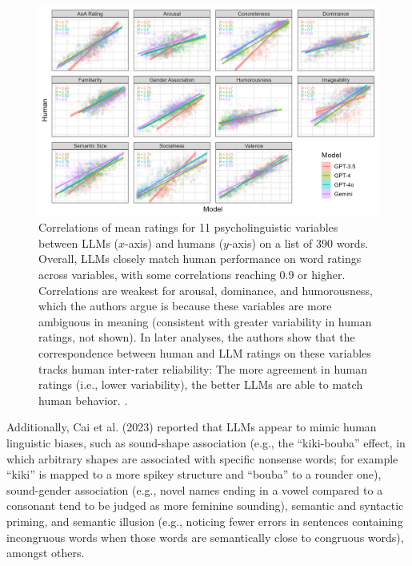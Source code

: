 \begin{figure}[h]
\centering
\includegraphics[scale=.8]{./images/humanVsLLM.png}
\caption[Figure borrowed from Kello et al. (2025, under review) with author permission.]{Correlations of mean ratings  for 11 psycholinguistic variables between LLMs ($x$-axis) and humans ($y$-axis) on a list of 390 words. Overall, LLMs closely match human performance on word ratings across variables, with some correlations reaching 0.9 or higher. Correlations are weakest for arousal, dominance, and humorousness, which the authors argue is because these variables are more ambiguous in meaning (consistent with greater variability in human ratings, not shown). In later analyses, the authors show that the correspondence between human and LLM ratings on these variables tracks human inter-rater reliability: The more agreement in human ratings (i.e., lower variability), the better LLMs are able to match human behavior.
.}
\label{humanVsLLM}
\end{figure}

Additionally, Cai et al. (2023) reported that LLMs appear to mimic human linguistic biases, such as sound-shape association (e.g., the ``kiki-bouba'' effect, in which arbitrary shapes are associated with specific nonsense words; for example ``kiki'' is mapped to a more spikey structure and ``bouba'' to a rounder one), sound-gender association (e.g., novel names ending in a vowel compared to a consonant tend to be judged as more feminine sounding), semantic and syntactic priming, and semantic illusion (e.g., noticing fewer errors in sentences containing incongruous words when those words are semantically close to congruous words), amongst others.

